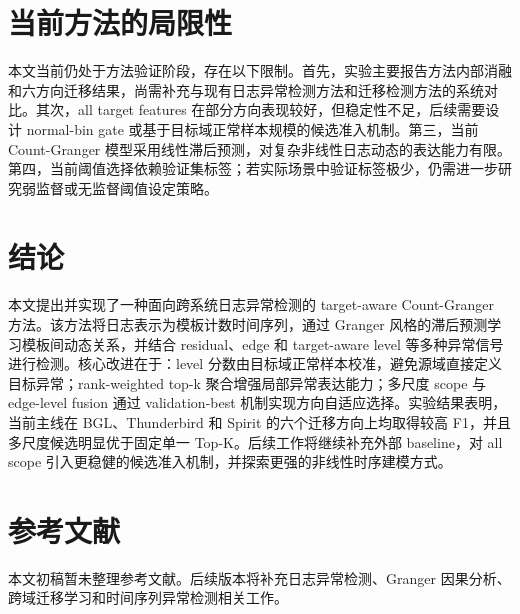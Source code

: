 \documentclass[UTF8,a4paper,zihao=-4]{ctexart}
\begin{document}
\section{当前方法的局限性}

本文当前仍处于方法验证阶段，存在以下限制。首先，实验主要报告方法内部消融和六方向迁移结果，尚需补充与现有日志异常检测方法和迁移检测方法的系统对比。其次，all target features 在部分方向表现较好，但稳定性不足，后续需要设计 normal-bin gate 或基于目标域正常样本规模的候选准入机制。第三，当前 Count-Granger 模型采用线性滞后预测，对复杂非线性日志动态的表达能力有限。第四，当前阈值选择依赖验证集标签；若实际场景中验证标签极少，仍需进一步研究弱监督或无监督阈值设定策略。

\section{结论}

本文提出并实现了一种面向跨系统日志异常检测的 target-aware Count-Granger 方法。该方法将日志表示为模板计数时间序列，通过 Granger 风格的滞后预测学习模板间动态关系，并结合 residual、edge 和 target-aware level 等多种异常信号进行检测。核心改进在于：level 分数由目标域正常样本校准，避免源域直接定义目标异常；rank-weighted top-k 聚合增强局部异常表达能力；多尺度 scope 与 edge-level fusion 通过 validation-best 机制实现方向自适应选择。实验结果表明，当前主线在 BGL、Thunderbird 和 Spirit 的六个迁移方向上均取得较高 F1，并且多尺度候选明显优于固定单一 Top-K。后续工作将继续补充外部 baseline，对 all scope 引入更稳健的候选准入机制，并探索更强的非线性时序建模方式。

\section*{参考文献}

本文初稿暂未整理参考文献。后续版本将补充日志异常检测、Granger 因果分析、跨域迁移学习和时间序列异常检测相关工作。
\end{document}
